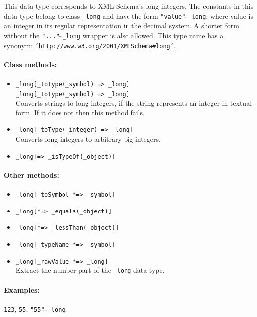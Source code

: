 \documentclass[11pt]{article}
\begin{document}
This data type corresponds to XML Schema's long integers.
The constants in this data type belong to class {\tt \_long} and have the
form {\tt "value"$\hat{~}\hat{~}$\_long}, where value is an integer in its regular
representation in the decimal system. A shorter form without the
{\tt "..."$\hat{~}\hat{~}$\_long}  wrapper is also allowed.
This type name has a synonym: {\tt 'http://www.w3.org/2001/XMLSchema\#long'}. 

\paragraph{Class methods:}
\begin{itemize}
    \item {\tt \_long[\_toType(\_symbol) => \_long]}   \\
    {\tt \_long[\_toType(\_symbol) => \_long]}   \\
      Converts strings to long integers, if the string represents an integer in textual form. If it does not then this method fails.
    \item {\tt \_long[\_toType(\_integer) => \_long]}   \\
     Converts long integers to arbitrary big integers.
    \item {\tt \_long[=> \_isTypeOf(\_object)]}  
\end{itemize}

\paragraph{Other methods:}
\begin{itemize}
\item {\tt \_long[\_toSymbol *=> \_symbol]}  
\item {\tt \_long[*=> \_equals(\_object)]}  
\item {\tt \_long[*=> \_lessThan(\_object)]}  
\item {\tt \_long[\_typeName *=> \_symbol]}   
\item {\tt \_long[\_rawValue *=> \_long]}
  \\
  Extract the number part of the {\tt \_long} data type. 
\end{itemize}

\paragraph{Examples:} {\tt 123},  {\tt 55}, {\tt "55"$\hat{~}\hat{~}$\_long}.
\end{document}
